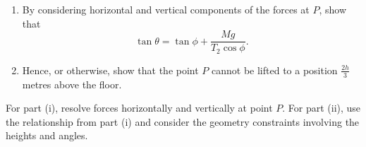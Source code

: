\begin{problem}
\begin{center}
\end{center}
\vspace{0.3em}

\begin{enumerate}
    \item[(i)] By considering horizontal and vertical components of the forces at $P$, show that
    \[
    \tan \theta = \tan \phi + \frac{Mg}{T_2 \cos \phi}.
    \]
    
    \item[(ii)] Hence, or otherwise, show that the point $P$ cannot be lifted to a position $\frac{2h}{3}$ metres above the floor.
\end{enumerate}
\end{problem}

\begin{hint}
For part (i), resolve forces horizontally and vertically at point $P$. For part (ii), use the relationship from part (i) and consider the geometry constraints involving the heights and angles.
\end{hint}

